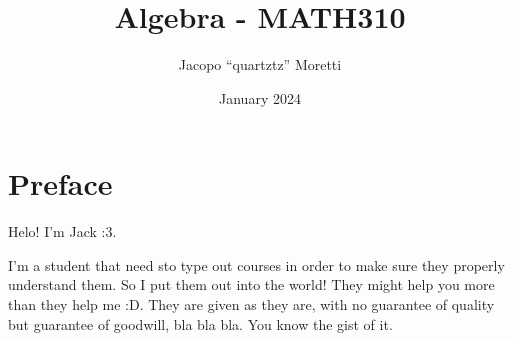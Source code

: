 \documentclass{report}
\title{Algebra - MATH310}
\author{Jacopo ``quartztz'' Moretti}
\date{January 2024}
\begin{document}
  \maketitle

  \chapter*{Preface}
  Helo! I'm Jack :3.

  I'm a student that need sto type out courses in order to make sure they properly understand them. So I put them out into the world! They might help you more than they help me :D. They are given as they are, with no guarantee of quality but guarantee of goodwill, bla bla bla. You know the gist of it. 

  \tableofcontents

  \pagebreak

  

  
  
  

  \appendix
  
  
\end{document}
